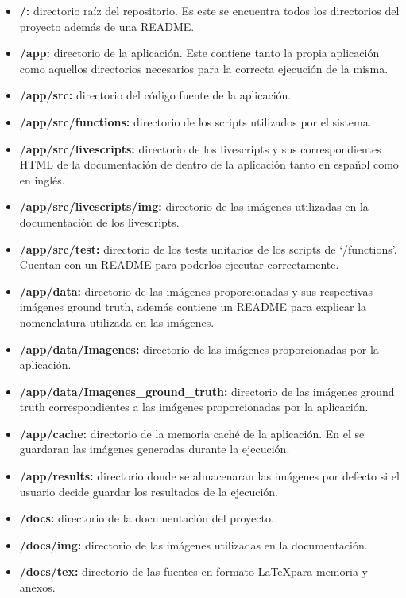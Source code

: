 \begin{itemize}
    \item \textbf{/:} directorio raíz del repositorio. Es este se encuentra todos los directorios del proyecto además de una README.
    \item \textbf{/app:} directorio de la aplicación. Este contiene tanto la propia aplicación como aquellos directorios necesarios para la correcta ejecución de la misma.
    \item \textbf{/app/src:} directorio del código fuente de la aplicación.
    \item \textbf{/app/src/functions:} directorio de los scripts utilizados por el sistema.
    \item \textbf{/app/src/livescripts:} directorio de los livescripts y sus correspondientes HTML de la documentación de dentro de la aplicación tanto en español como en inglés.
    \item \textbf{/app/src/livescripts/img:} directorio de las imágenes utilizadas en la documentación de los livescripts.
    \item \textbf{/app/src/test:} directorio de los tests unitarios de los scripts de `/functions'. Cuentan con un README para poderlos ejecutar correctamente.
    \item \textbf{/app/data:} directorio de las imágenes proporcionadas y sus respectivas imágenes ground truth, además contiene un README para explicar la nomenclatura utilizada en las imágenes.
    \item \textbf{/app/data/Imagenes:} directorio de las imágenes proporcionadas por la aplicación.
    \item \textbf{/app/data/Imagenes\_ground\_truth:} directorio de las imágenes ground truth correspondientes a las imágenes proporcionadas por la aplicación.
    \item \textbf{/app/cache:} directorio de la memoria caché de la aplicación. En el se guardaran las imágenes generadas durante la ejecución.
    \item \textbf{/app/results:} directorio donde se almacenaran las imágenes por defecto si el usuario decide guardar los resultados de la ejecución.
    \item \textbf{/docs:} directorio de la documentación del proyecto.
    \item \textbf{/docs/img:} directorio de las imágenes utilizadas en la documentación.
    \item \textbf{/docs/tex:} directorio de las fuentes en formato \LaTeX para memoria y anexos.
\end{itemize}

